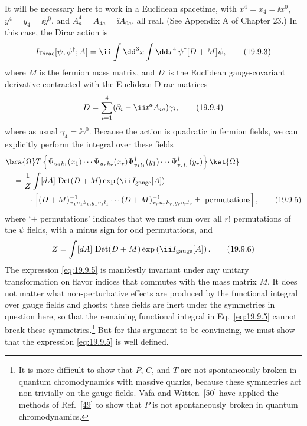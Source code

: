 It will be necessary here to work in a Euclidean spacetime, with $x^4=x_4=\ii x^0$, $y^4=y_4=\ii y^0$, and $A^4_a=A_{4a}=\ii A_{0a}$, all real. (See Appendix A of Chapter 23.) In this case, the Dirac action is
\begin{equation}
I_{\mathrm{Dirac}}[\psi,\psi^\dagger;A]
=\ii\int \dd^3x\int \dd x^4\,
\psi^\dagger[\sl{D}+M]\psi,
\tag{19.9.3}\label{eq:19.9.3}
\end{equation}
where $M$ is the fermion mass matrix, and $\sl{D}$ is the Euclidean gauge-covariant derivative contracted with the Euclidean Dirac matrices
\begin{equation}
\sl{D}
=\sum_{i=1}^4(\partial_i-\ii t^a A_{ia})\gamma_i,
\tag{19.9.4}\label{eq:19.9.4}
\end{equation}
where as usual $\gamma_4=\ii\gamma^0$. Because the action is quadratic in fermion fields, we can explicitly perform the integral over these fields
\begin{align}
&\bra{\Omega}T\left\{
\Psi_{u_1k_1}(x_1)\cdots\Psi_{u_rk_r}(x_r)
\Psi^\dagger_{v_1l_1}(y_1)\cdots\Psi^\dagger_{v_rl_r}(y_r)
\right\}\ket{\Omega}
\notag\\
&\quad=\frac{1}{Z}\int[dA]\,
\operatorname{Det}(\sl{D}+M)
\exp\left(\ii I_{\mathrm{gauge}}[A]\right)
\notag\\
&\qquad\quad{}\cdot
\left[
(\sl{D}+M)^{-1}_{x_1u_1k_1,y_1v_1l_1}
\cdots
(\sl{D}+M)^{-1}_{x_ru_rk_r,y_rv_rl_r}
\mathbin{\pm}\text{ permutations}
\right],
\tag{19.9.5}\label{eq:19.9.5}
\end{align}
where `$\mathbin{\pm}$ permutations' indicates that we must sum over all $r!$ permutations of the $\psi$ fields, with a minus sign for odd permutations, and
\begin{equation}
Z=\int[dA]\,
\operatorname{Det}(\sl{D}+M)
\exp\left(\ii I_{\mathrm{gauge}}[A]\right).
\tag{19.9.6}\label{eq:19.9.6}
\end{equation}
The expression \eqref{eq:19.9.5} is manifestly invariant under any unitary transformation on flavor indices that commutes with the mass matrix $M$. It does not matter what non-perturbative effects are produced by the functional integral over gauge fields and ghosts; these fields are inert under the symmetries in question here, so that the remaining functional integral in Eq.~\eqref{eq:19.9.5} cannot break these symmetries.\footnote{It is more difficult to show that $P$, $C$, and $T$ are not spontaneously broken in quantum chromodynamics with massive quarks, because these symmetries act non-trivially on the gauge fields. Vafa and Witten~\hyperref[ch19-ref-50]{[50]} have applied the methods of Ref.~\hyperref[ch19-ref-49]{[49]} to show that $P$ is not spontaneously broken in quantum chromodynamics.} But for this argument to be convincing, we must show that the expression \eqref{eq:19.9.5} is well defined.

